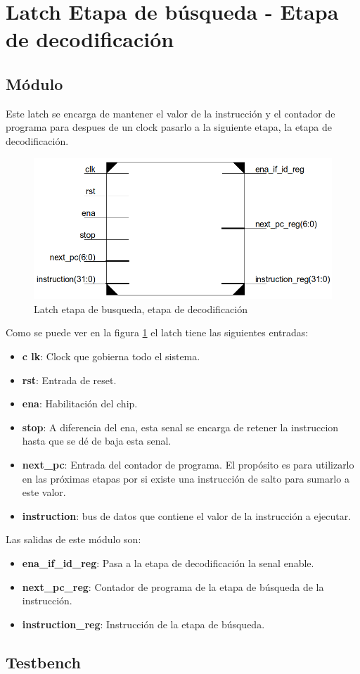\section{Latch Etapa de búsqueda - Etapa de decodificaci\'on}
\subsection{M\'odulo}
Este latch se encarga de mantener el valor de la instrucci\'on y el contador de programa para despues de un clock pasarlo a la siguiente etapa, la etapa de decodificaci\'on.

\begin{figure}[H]
\centering
\includegraphics[scale=0.35]{img/latch_if_id}
\caption{Latch etapa de busqueda, etapa de decodificaci\'on}
\label{fig:latchifid}
\end{figure}

Como se puede ver en la figura \ref{fig:latchifid} el latch tiene las siguientes entradas:
\begin{itemize}
  \item \textbf{c
  lk}: Clock que gobierna todo el sistema.
  \item \textbf{rst}: Entrada de reset.
  \item \textbf{ena}: Habilitaci\'on del chip.
  \item \textbf{stop}: A diferencia del ena, esta senal se encarga de retener la instruccion hasta que se d\'e de baja esta senal.
  \item \textbf{next\_pc}: Entrada del contador de programa. El prop\'osito es para utilizarlo en las pr\'oximas etapas por si existe una instrucci\'on de salto para sumarlo a este valor.
  \item \textbf{instruction}: bus de datos que contiene el valor de la instrucci\'on a ejecutar.  
\end{itemize}

Las salidas de este m\'odulo son:
\begin{itemize}
  \item \textbf{ena\_if\_id\_reg}: Pasa a la etapa de decodificaci\'on la senal enable.
  \item \textbf{next\_pc\_reg}: Contador de programa de la etapa de b\'usqueda de la instrucci\'on.
  \item \textbf{instruction\_reg}: Instrucci\'on de la etapa de b\'usqueda.
\end{itemize}

\subsection{Testbench}